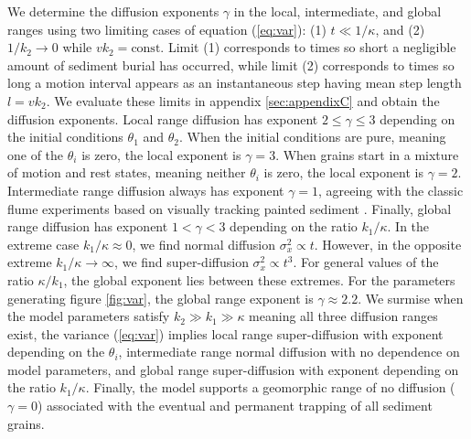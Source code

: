 \documentclass[]{agujournal2018}
\begin{document}
We determine the diffusion exponents $\gamma$ in the local, intermediate, and global ranges using two limiting cases of equation (\ref{eq:var}): (1) $t\ll 1/\kappa$, and (2) $1/k_2 \rightarrow 0$ while $vk_2 = \text{const}$.
Limit (1) corresponds to times so short a negligible amount of sediment burial has occurred, while limit (2) corresponds to times so long a motion interval appears as an instantaneous step having mean step length $l=vk_2$.
We evaluate these limits in appendix \ref{sec:appendixC} and obtain the diffusion exponents.
Local range diffusion has exponent $2 \leq \gamma \leq 3$ depending on the initial conditions $\theta_1$ and $\theta_2$.
When the initial conditions are pure, meaning one of the $\theta_i$ is zero, the local exponent is $\gamma=3$.
When grains start in a mixture of motion and rest states, meaning neither $\theta_i$ is zero, the local exponent is $\gamma=2$.
Intermediate range diffusion always has exponent $\gamma=1$, agreeing with the classic flume experiments based on visually tracking painted sediment \citep[e.g.][]{Einstein1937,Yano1969a,Nakagawa1976}.
Finally, global range diffusion has exponent $1 < \gamma < 3$ depending on the ratio $k_1/\kappa$.
In the extreme case $k_1/\kappa \approx 0 $, we find normal diffusion $\sigma_x^2 \propto t$. 
However, in the opposite extreme $k_1/\kappa \rightarrow \infty$, we find  super-diffusion $\sigma_x^2 \propto t^3$.
For general values of the ratio $\kappa/k_1$, the global exponent lies between these extremes.
For the parameters generating figure \ref{fig:var}, the global range exponent is $\gamma \approx 2.2$. 
We surmise when the model parameters satisfy $k_2\gg k_1 \gg \kappa$ meaning all three diffusion ranges exist, the variance (\ref{eq:var}) implies local range super-diffusion with exponent depending on the $\theta_i$, intermediate range normal diffusion with no dependence on model parameters, and global range super-diffusion with exponent depending on the ratio $k_1/\kappa$.
Finally, the model supports a geomorphic range of no diffusion ($\gamma=0$) associated with the eventual and permanent trapping of all sediment grains.
\end{document}
